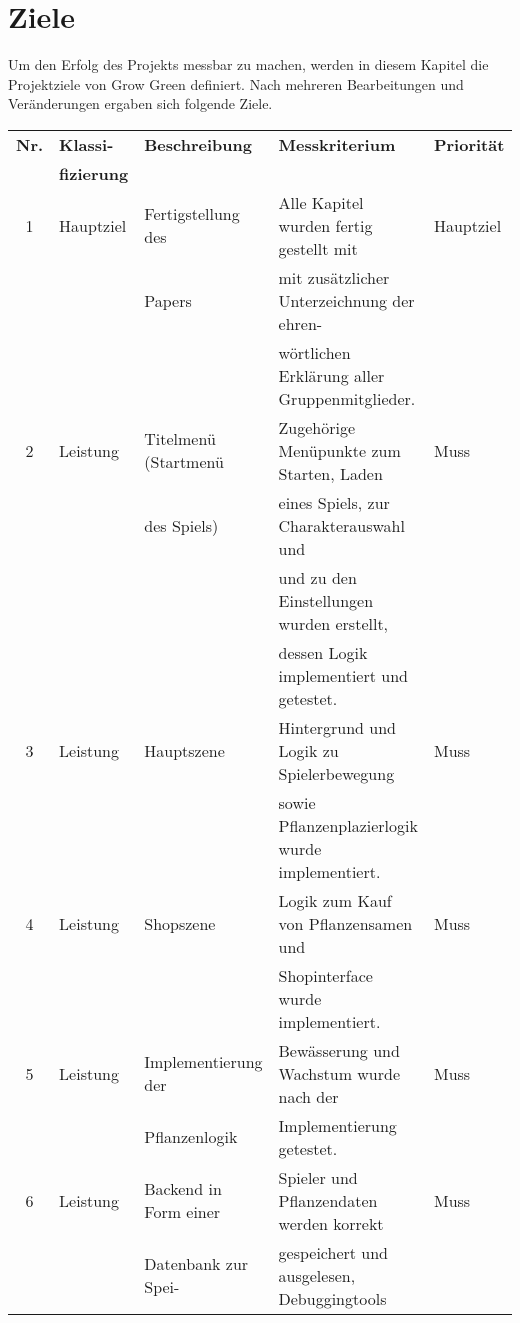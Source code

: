 \chapter{Ziele}\label{ch:ziele}
Um den Erfolg des Projekts messbar zu machen, werden in diesem Kapitel die Projektziele von Grow Green definiert.
Nach mehreren Bearbeitungen und Veränderungen ergaben sich folgende Ziele.
\vspace{0.5cm}
\begin{table}[H]
    \begin{tabular}{|c|l|l|l|l|}
        \hline
        \textbf{Nr.} & \textbf{Klassi-} & \textbf{Beschreibung} & \textbf{Messkriterium} & \textbf{Priorität}\\
        & \textbf{fizierung} &&&\\[0.5ex]
        \hline \hline
        1 & Hauptziel & Fertigstellung des & Alle Kapitel wurden fertig gestellt mit & Hauptziel\\
        && Papers & mit zusätzlicher Unterzeichnung der ehren- &\\
        &&& wörtlichen Erklärung aller Gruppenmitglieder.&\\
        \hline
        2 & Leistung & Titelmenü (Startmenü & Zugehörige Menüpunkte zum Starten, Laden & Muss\\
        && des Spiels) & eines Spiels, zur Charakterauswahl und & \\
        &&& und zu den Einstellungen wurden erstellt,&\\
        &&& dessen Logik implementiert und getestet. & \\
        \hline
        3 & Leistung & Hauptszene & Hintergrund und Logik zu Spielerbewegung & Muss\\
        &&& sowie Pflanzenplazierlogik wurde implementiert. & \\
        \hline
        4 & Leistung &Shopszene& Logik zum Kauf von Pflanzensamen und & Muss\\
        &&& Shopinterface wurde implementiert.&\\
        \hline
        5 & Leistung & Implementierung der & Bewässerung und Wachstum wurde nach der & Muss\\
        && Pflanzenlogik & Implementierung getestet. &\\
        \hline
        6 & Leistung & Backend in Form einer & Spieler und Pflanzendaten werden korrekt & Muss\\
        && Datenbank zur Spei- & gespeichert und ausgelesen, Debuggingtools &\\

\end{tabular}
\end{table}
